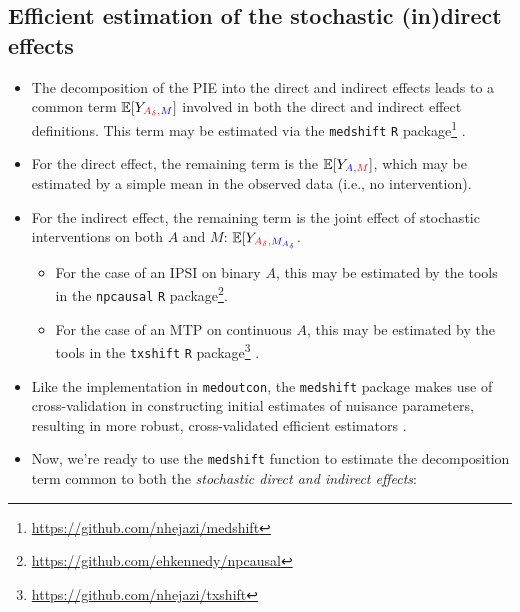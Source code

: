 \documentclass[
  12pt,
]{book}
\newcommand{\passthrough}[1]{#1}
\providecommand{\tightlist}{%
  \setlength{\itemsep}{0pt}\setlength{\parskip}{0pt}}
\renewcommand{\href}[2]{#2\footnote{\url{#1}}}
\theoremstyle{definition}
\theoremstyle{definition}
\theoremstyle{definition}
\newcommand{\E}{\mathbb{E}}
\newcommand{\1}{\mathbbm{1}}
\begin{document}
\hypertarget{efficient-estimation-of-the-stochastic-indirect-effects}{%
\subsection{Efficient estimation of the stochastic (in)direct effects}\label{efficient-estimation-of-the-stochastic-indirect-effects}}

\begin{itemize}
\tightlist
\item
  The decomposition of the PIE into the direct and indirect effects leads to a
  common term \(\E[Y_{\color{red}{A_\delta},\color{blue}{M}}]\) involved in both
  the direct and indirect effect definitions. This term may be estimated via the
  \href{https://github.com/nhejazi/medshift}{\passthrough{\lstinline!medshift!} \passthrough{\lstinline!R!} package}
  \citep{hejazi2020medshift}.
\item
  For the direct effect, the remaining term is the
  \(\E[Y_{\color{blue}{A},\color{red}{M}}]\), which may be estimated by a simple
  mean in the observed data (i.e., no intervention).
\item
  For the indirect effect, the remaining term is the joint effect of stochastic
  interventions on both \(A\) and \(M\):
  \(\E[Y_{\color{red}{A_\delta},\color{blue}{M_{A_\delta}}}\).

  \begin{itemize}
  \tightlist
  \item
    For the case of an IPSI on binary \(A\), this may be estimated by the tools
    in the \href{https://github.com/ehkennedy/npcausal}{\passthrough{\lstinline!npcausal!} \passthrough{\lstinline!R!} package}.
  \item
    For the case of an MTP on continuous \(A\), this may be estimated by the tools
    in the \href{https://github.com/nhejazi/txshift}{\passthrough{\lstinline!txshift!} \passthrough{\lstinline!R!} package}
    \citep{hejazi2020txshift-rpkg, hejazi2020txshift-joss}.
  \end{itemize}
\item
  Like the implementation in \passthrough{\lstinline!medoutcon!}, the \passthrough{\lstinline!medshift!} package makes use of
  cross-validation in constructing initial estimates of nuisance parameters,
  resulting in more robust, cross-validated efficient estimators
  \citep{klaassen1987consistent, zheng2011cross, chernozhukov2018double}.
\item
  Now, we're ready to use the \passthrough{\lstinline!medshift!} function to estimate the decomposition
  term common to both the \emph{stochastic direct and indirect effects}:
\end{itemize}
\end{document}
